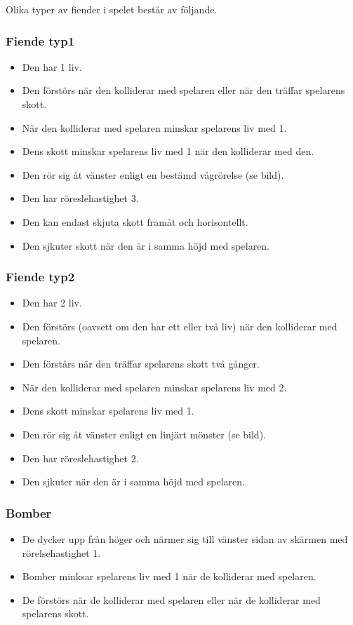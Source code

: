 \documentclass{TDP005mall}
\begin{document}
Olika typer av fiender i spelet består av följande.

\subsubsection*{Fiende typ1}
\begin{itemize}
\item Den har 1 liv.
\item Den förstörs när den kolliderar med spelaren eller när den träffar spelarens skott.
\item När den kolliderar med spelaren minskar spelarens liv med 1.
\item Dens skott minskar spelarens liv med 1 när den kolliderar med den.
\item Den rör sig åt vänster enligt en bestämd vågrörelse (se bild).
\item Den har röreslehastighet 3.
\item Den kan endast skjuta skott framåt och horisontellt.
\item Den sjkuter skott när den är i samma höjd med spelaren.
\end{itemize}

\subsubsection*{Fiende typ2}
\begin{itemize}
\item Den har 2 liv.
\item Den förstörs (oavsett om den har ett eller två liv) när den kolliderar med spelaren.
\item Den förstårs när den träffar spelarens skott två gånger.
\item När den kolliderar med spelaren minskar spelarens liv med 2.
\item Dens skott minskar spelarens liv med 1.
\item Den rör sig åt vänster enligt en linjärt mönster (se bild).
\item Den har röreslehastighet 2.
\item Den sjkuter när den är i samma höjd med spelaren.
\end{itemize}

\subsubsection*{Bomber}
\begin{itemize}
\item De dycker upp från höger och närmer sig till vänster sidan av skärmen med rörelsehastighet 1.
\item Bomber minksar spelarens liv med 1 när de kolliderar med spelaren.
\item De förstörs när de kolliderar med spelaren eller när de kolliderar med spelarens skott.

\end{itemize}
\end{document}
